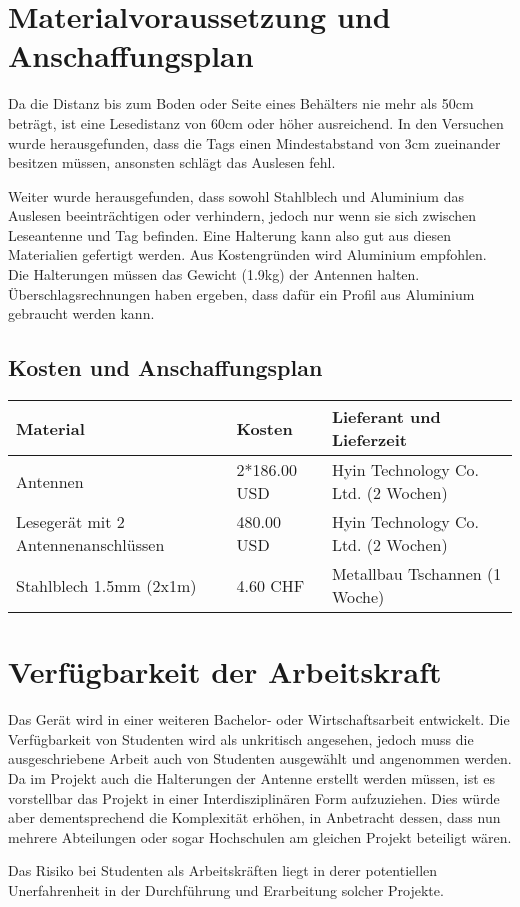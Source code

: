 \chapter{Materialvoraussetzung und Anschaffungsplan}
\label{sec:Materialvoraussetzung_Anschaffungsplan}
Da die Distanz bis zum Boden oder Seite eines Behälters nie mehr als 50cm beträgt, ist eine Lesedistanz von 60cm oder höher ausreichend. In den Versuchen wurde herausgefunden, dass die Tags einen Mindestabstand von 3cm zueinander besitzen müssen, ansonsten schlägt das Auslesen fehl.

Weiter wurde herausgefunden, dass sowohl Stahlblech und Aluminium das Auslesen beeinträchtigen oder verhindern, jedoch nur wenn sie sich zwischen Leseantenne und Tag befinden. Eine Halterung kann also gut aus diesen Materialien gefertigt werden. Aus Kostengründen wird Aluminium empfohlen. Die Halterungen müssen das Gewicht (1.9kg) der Antennen halten. Überschlagsrechnungen haben ergeben, dass dafür ein Profil aus Aluminium gebraucht werden kann.

\section{Kosten und Anschaffungsplan}
\begin{table}[h!]
	\centering
	\begin{tabularx}{\textwidth}{|X|X|X|}
		\hline
		\textbf{Material} & \textbf{Kosten} & \textbf{Lieferant und Lieferzeit} \\
		\hline
		Antennen & 2*186.00 USD & Hyin Technology Co. Ltd. (2 Wochen)\\
		\hline
		Lesegerät mit 2 Antennenanschlüssen & 480.00 USD & Hyin Technology Co. Ltd. (2 Wochen)\\
		\hline
		Stahlblech 1.5mm (2x1m) & 4.60 CHF & Metallbau Tschannen (1 Woche)\\
		\hline
	\end{tabularx}
\end{table}

\chapter{Verfügbarkeit der Arbeitskraft}
Das Gerät wird in einer weiteren Bachelor- oder Wirtschaftsarbeit entwickelt. Die Verfügbarkeit von Studenten wird als unkritisch angesehen, jedoch muss die ausgeschriebene Arbeit auch von Studenten ausgewählt und angenommen werden. Da im Projekt auch die Halterungen der Antenne erstellt werden müssen, ist es vorstellbar das Projekt in einer Interdisziplinären Form aufzuziehen. Dies würde aber dementsprechend die Komplexität erhöhen, in Anbetracht dessen, dass nun mehrere Abteilungen oder sogar Hochschulen am gleichen Projekt beteiligt wären.

Das Risiko bei Studenten als Arbeitskräften liegt in derer potentiellen Unerfahrenheit in der Durchführung und Erarbeitung solcher Projekte.
